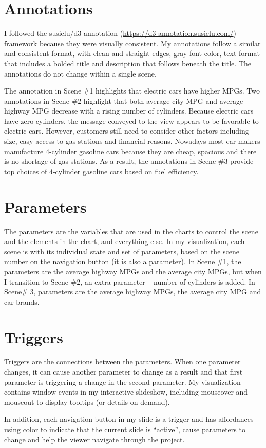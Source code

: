 \documentclass[11pt]{article}
\begin{document}
\begin{enumerate}
\end{enumerate}

\section{Annotations}
I followed the susielu/d3-annotation (\url{https://d3-annotation.susielu.com/}) framework because they were visually consistent. My annotations follow a similar and consistent format, with clean and straight edges, gray font color, text format that includes a bolded title and description that follows beneath the title.
The annotations do not change within a single scene.

The annotation in Scene \#1 highlights that electric cars have higher MPGs. Two annotations in Scene \#2 highlight that both average city MPG and average highway MPG decrease with a rising number of cylinders. Because electric cars have zero cylinders, the message conveyed to the view appears to be favorable to electric cars. However,  customers still need to consider other factors including size, easy access to gas stations and financial reasons. Nowadays most car makers manufacture 4-cylinder gasoline cars because they are cheap, spacious and there is no shortage of gas stations. As a result, the annotations in Scene \#3 provide top choices of 4-cylinder gasoline cars based on fuel efficiency.

\section{Parameters}
The parameters are the variables that are used in the charts to control the scene and the elements in the chart, and everything else. In my visualization, each scene is with its individual state and set of parameters, based on the scene number on the navigation button (it is also a parameter). In Scene \#1, the parameters are the average highway MPGs and the average city MPGs, but when I transition to Scene \#2,  an extra parameter -- number of cylinders is added. In Scene\# 3, parameters are the average highway MPGs, the average city MPG and car brands.

\section{Triggers}
Triggers are the connections between the parameters. When one parameter changes, it can cause another parameter to change as a result and that first parameter is triggering a change in the second parameter. My visualization contains window events in my interactive slideshow, including mouseover and mouseout to display tooltips (or details on demand). 

In addition, each navigation button in my slide is a trigger and has affordances using color to indicate that the current slide is “active”, cause parameters to change and help the viewer navigate through the project.
\end{document}
